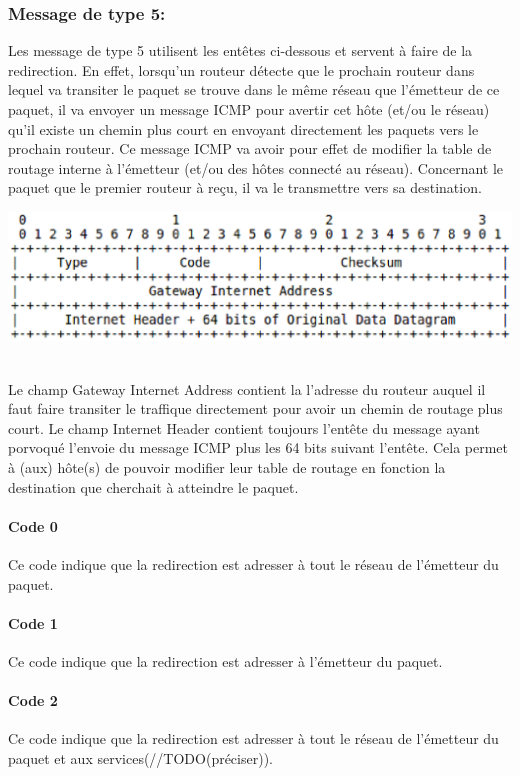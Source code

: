 \documentclass[twoside,openright,a4paper,11pt,french]{article}
\begin{document}
\subsubsection{Message de type 5:}
Les message de type 5 utilisent les entêtes ci-dessous et servent à faire de la redirection. En effet, lorsqu'un routeur détecte que le prochain routeur dans lequel va transiter le paquet se trouve dans le même réseau que l'émetteur de ce paquet, il va envoyer un message ICMP pour avertir cet hôte (et/ou le réseau) qu'il existe un chemin plus court en envoyant directement les paquets vers le prochain routeur. Ce message ICMP va avoir pour effet de modifier la table de routage interne à l'émetteur (et/ou des hôtes connecté au réseau). Concernant le paquet que le premier routeur à reçu, il va le transmettre vers sa destination.

\includegraphics[width=15cm]{./pics/header2.eps}

\\
Le champ Gateway Internet Address contient la l'adresse du routeur auquel il faut faire transiter le traffique directement pour avoir un chemin de routage plus court.
Le champ Internet Header contient toujours l'entête du message ayant porvoqué l'envoie du message ICMP plus les 64 bits suivant l'entête. Cela permet à (aux) hôte(s) de pouvoir modifier leur table de routage en fonction la destination que cherchait à atteindre le paquet.
\paragraph{Code 0}
Ce code indique que la redirection est adresser à tout le réseau de l'émetteur du paquet.
\paragraph{Code 1}
Ce code indique que la redirection est adresser à l'émetteur du paquet.
\paragraph{Code 2}
Ce code indique que la redirection est adresser à tout le réseau de l'émetteur du paquet et aux services(//TODO(préciser)).
\end{document}
